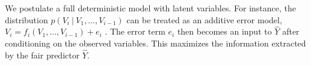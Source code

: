  We postulate a full deterministic model with
latent variables. For instance, the distribution $p(V_i\ |\ V_1,
\dots, V_{i - 1})$ can be treated as an additive error model, $V_i
\!=\! f_i(V_1, \dots, V_{i - 1}) \!+\! e_i$ \citep{peters:14}. The
error term $e_i$ then becomes an input to $\hat Y$ after conditioning
on the observed variables. This maximizes the information extracted by
the fair predictor $\hat Y$.


